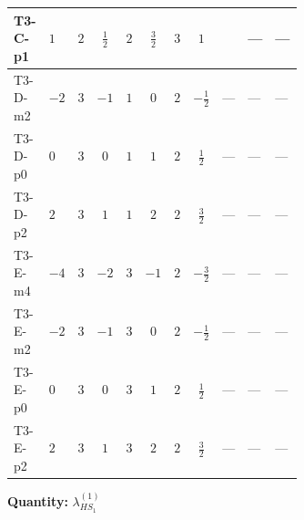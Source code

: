 \documentclass[8pt]{article}
\begin{document}
\begin{landscape}
\begin{longtable}{@{}llcccccc >{\raggedright\arraybackslash}p{0.21\linewidth} >{\raggedright\arraybackslash}p{0.21\linewidth} >{\raggedright\arraybackslash}p{0.21\linewidth}@{}}
\midrule
T3-C-p1 & $1$ & $2$ & $\frac{1}{2}$ & $2$ & $\frac{3}{2}$ & $3$ & $1$ & \scriptsize\adjustbox{max width=\linewidth}{$\begin{gathered} +\frac{3 {\lambda_{HS_1}^{(A)}}^2}{4}\end{gathered}$} & --- & --- \\
\midrule
T3-D-m2 & $-2$ & $3$ & $-1$ & $1$ & $0$ & $2$ & $-\frac{1}{2}$ & --- & --- & --- \\
\midrule
T3-D-p0 & $0$ & $3$ & $0$ & $1$ & $1$ & $2$ & $\frac{1}{2}$ & --- & --- & --- \\
\midrule
T3-D-p2 & $2$ & $3$ & $1$ & $1$ & $2$ & $2$ & $\frac{3}{2}$ & --- & --- & --- \\
\midrule
T3-E-m4 & $-4$ & $3$ & $-2$ & $3$ & $-1$ & $2$ & $-\frac{3}{2}$ & --- & --- & --- \\
\midrule
T3-E-m2 & $-2$ & $3$ & $-1$ & $3$ & $0$ & $2$ & $-\frac{1}{2}$ & --- & --- & --- \\
\midrule
T3-E-p0 & $0$ & $3$ & $0$ & $3$ & $1$ & $2$ & $\frac{1}{2}$ & --- & --- & --- \\
\midrule
T3-E-p2 & $2$ & $3$ & $1$ & $3$ & $2$ & $2$ & $\frac{3}{2}$ & --- & --- & --- \\
\midrule
\bottomrule
\end{longtable}
\clearpage
\noindent\textbf{Quantity: }$\lambda_{HS_1}^{(1)}$\par\smallskip

\end{landscape}
\end{document}

